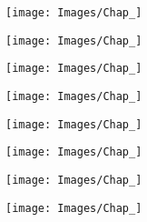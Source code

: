 

\begin{figure}
    \begin{subfigure}[t]{0.5\linewidth}
        \flushleft
        \texttt{[image: Images/Chap\_]}
        \caption{}
        \label{fig:}
    \end{subfigure}
    \begin{subfigure}[t]{0.5\linewidth}
        \flushright
        \texttt{[image: Images/Chap\_]}
        \caption{}
        \label{fig:}
    \end{subfigure}
    \caption{}
    \label{}
\end{figure}




\begin{figure}
    \begin{subfigure}[t]{0.33\linewidth}
        \flushleft
        \texttt{[image: Images/Chap\_]}
        \caption{}
        \label{fig:}
    \end{subfigure}\hfill
    \begin{subfigure}[t]{0.33\linewidth}
        \centering
        \texttt{[image: Images/Chap\_]}
        \caption{}
        \label{fig:}
    \end{subfigure}\hfill
    \begin{subfigure}[t]{0.33\linewidth}
        \flushright
        \texttt{[image: Images/Chap\_]}
        \caption{}
        \label{fig:}
    \end{subfigure}
    \caption{}
    \label{}
\end{figure}



\begin{figure}
    \begin{subfigure}[t]{0.5\linewidth}
        \flushleft
        \texttt{[image: Images/Chap\_]}
        \caption{}
        \label{fig:}
    \end{subfigure}\hfill
    \begin{subfigure}[t]{0.5\linewidth}
        \flushright
        \texttt{[image: Images/Chap\_]}
        \caption{}
        \label{fig:}
    \end{subfigure}
    \begin{subfigure}[t]{\linewidth}
        \centering
        \texttt{[image: Images/Chap\_]}
        \caption{}
        \label{fig:}
    \end{subfigure}
    \caption{}
    \label{}
\end{figure}